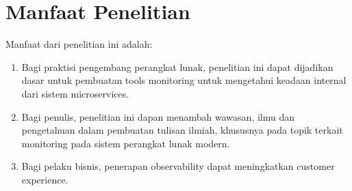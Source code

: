
\section{Manfaat Penelitian}
Manfaat dari penelitian ini adalah:
\begin{enumerate}
\item Bagi praktisi pengembang perangkat lunak, penelitian ini dapat dijadikan dasar untuk pembuatan tools monitoring untuk mengetahui keadaan internal dari sistem microservices.
\item Bagi penulis, penelitian ini dapan menambah wawasan, ilmu dan pengetahuan dalam pembuatan tulisan ilmiah, khususnya pada topik terkait monitoring pada sistem perangkat lunak modern.
\item Bagi pelaku bisnis, penerapan observability dapat meningkatkan customer experience.\\
\end{enumerate}

